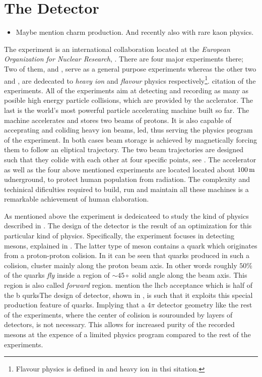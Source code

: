 \chapter{The \lhcb Detector}
\label{lhcb_detector}

\begin{itemize}
  \item Maybe mention charm production. And recently also with rare kaon physics.
\end{itemize}

The \lhcb experiment is an international collaboration located at the {\it European Organization for Nuclear Research}, \cern.
There are four major experiments there; Two of them, \atlas and \cms, serve as a general purpose experiments whereas the other
two \alice and \lhcb, are dedecated to {\it heavy ion} and {\it flavour} physics respectively\footnote{Flavour physics is  defined in and heavy ion in thsi sitation.}.
{\color{red} citation of the experiments}. All of the experiments aim at detecting and recording as many as posible high energy
particle collisions, which are provided by the \lhc acclerator. The last is the world's most powerful particle accelerating
machine built so far. The \lhc machine accelerates and stores two beams of protons. It is also capable of acceprating
and coliding heavy ion beams, \eg led, thus serving the physics program of the \alice experiment.
In both cases beam storage is achieved by magnetically forcing them to follow an eliptical trajectory.
The two beam trajectories are designed such that they colide with each other at four specific points, see \figref{}.
The \lhc accelerator as well as the four above mentioned experiments are located located about $100\rm \,m$ udnerground,
to protect human population from radiation. The complexity and techinical dificulties required to build, run and maintain
all these machines is a remarkable achievement of human claboration.

As mentioned above the \lhcb experiment is dedeicateed to study the kind of physics described in \secref{}.
The design of the \lhcb detector is the result of an optimization for this particular kind of physics.
Specifically, the experiment focuses in detecting \B mesons, explained in \secref{}. The latter type of
meson contains a \bquark quark which originates from a proton-proton colision. In \figref{} it can be seen
that \bquark quarks produced in such a colision, cluster mainly along the proton beam axis. In other words
roughly $50\%$ of the \bquark quarks {\it fly} inside a region of $\sim 45\circ$ solid angle along the beam axis.
This region is also called {\it forward} region. {\color{red} mention the lhcb acceptance  which is half of the b qurks}The design of \lhcb detector, shown in \figref{}, is such that
it exploits this special production feature of \bquark quarks. Implying that a $4\pi$ detector geometry like the
rest of the \lhc experiments, where the center of colision is sourounded by layers of detectors, is not necessary.
This allows for increased purity of the recorded \B mesons at the expence of a limited physics program compared
to the rest of the \lhcb experiments.

